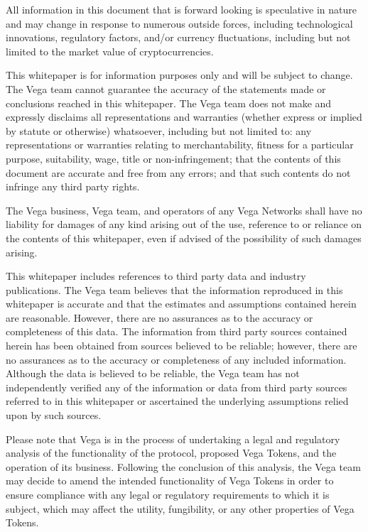 \begin{scriptsize}
All information in this document that is forward looking is speculative in nature and may change in response to numerous outside forces, including technological innovations, regulatory factors, and/or currency fluctuations, including but not limited to the market value of cryptocurrencies.

This whitepaper is for information purposes only and will be subject to change. The Vega team cannot guarantee the accuracy of the statements made or conclusions reached in this whitepaper. The Vega team does not make and expressly disclaims all representations and warranties (whether express or implied by statute or otherwise) whatsoever, including but not limited to: any representations or warranties relating to merchantability, fitness for a particular purpose, suitability, wage, title or non-infringement; that the contents of this document are accurate and free from any errors; and that such contents do not infringe any third party rights.

The Vega business, Vega team, and operators of any Vega Networks shall have no liability for damages of any kind arising out of the use, reference to or reliance on the contents of this whitepaper, even if advised of the possibility of such damages arising. 

This whitepaper includes references to third party data and industry publications. The Vega team believes that the information reproduced in this whitepaper is accurate and that the estimates and assumptions contained herein are reasonable. However, there are no assurances as to the accuracy or completeness of this data. The information from third party sources contained herein has been obtained from sources believed to be reliable; however, there are no assurances as to the accuracy or completeness of any included information. Although the data is believed to be reliable, the Vega team has not independently verified any of the information or data from third party sources referred to in this whitepaper or ascertained the underlying assumptions relied upon by such sources.

Please note that Vega is in the process of undertaking a legal and regulatory analysis of the functionality of the protocol, proposed Vega Tokens, and the operation of its business. Following the conclusion of this analysis, the Vega team may decide to amend the intended functionality of Vega Tokens in order to ensure compliance with any legal or regulatory requirements to which it is subject, which may affect the utility, fungibility, or any other properties of Vega Tokens.


\end{scriptsize}
